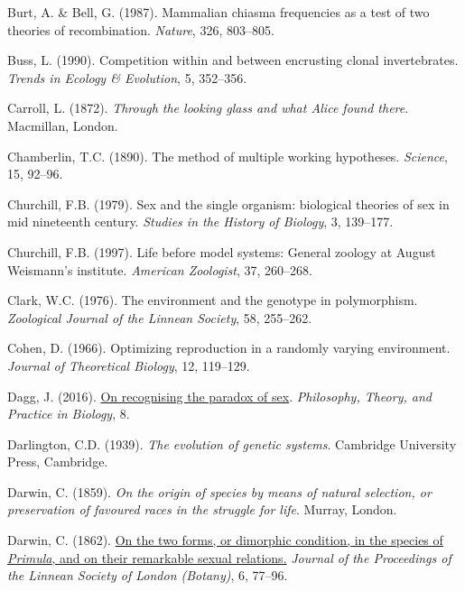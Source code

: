 \documentclass[
  american,
  letterpaper,
]{book}
\newlength{\cslhangindent}
\newenvironment{CSLReferences}[2] %
 {\begin{list}{}{%
  \setlength{\itemindent}{0pt}
  \setlength{\leftmargin}{0pt}
  \setlength{\parsep}{0pt}
  \ifodd #1
   \setlength{\leftmargin}{\cslhangindent}
   \setlength{\itemindent}{-1\cslhangindent}
  \fi
  \setlength{\itemsep}{#2\baselineskip}}}
 {\end{list}}
\begin{document}
\begin{CSLReferences}{1}{0}
Burt, A. \& Bell, G. (1987). Mammalian chiasma frequencies as a test of
two theories of recombination. \emph{Nature}, 326, 803--805.

Buss, L. (1990). Competition within and between encrusting clonal
invertebrates. \emph{Trends in Ecology \& Evolution}, 5, 352--356.

Carroll, L. (1872). \emph{Through the looking glass and what {Alice}
found there}. Macmillan, London.

Chamberlin, T.C. (1890). The method of multiple working hypotheses.
\emph{Science}, 15, 92--96.

Churchill, F.B. (1979). Sex and the single organism: {b}iological
theories of sex in mid nineteenth century. \emph{Studies in the History
of Biology}, 3, 139--177.

Churchill, F.B. (1997). Life before model systems: General zoology at
{August Weismann's} institute. \emph{American Zoologist}, 37, 260--268.

Clark, W.C. (1976). The environment and the genotype in polymorphism.
\emph{Zoological Journal of the Linnean Society}, 58, 255--262.

Cohen, D. (1966). Optimizing reproduction in a randomly varying
environment. \emph{Journal of Theoretical Biology}, 12, 119--129.

Dagg, J. (2016). \href{https://doi.org/10.3998/ptb.6959004.0008.003}{On
recognising the paradox of sex}. \emph{Philosophy, Theory, and Practice
in Biology}, 8.

Darlington, C.D. (1939). \emph{The evolution of genetic systems}.
Cambridge University Press, Cambridge.

Darwin, C. (1859). \emph{On the origin of species by means of natural
selection, or preservation of favoured races in the struggle for life}.
Murray, London.

Darwin, C. (1862).
\href{https://doi.org/10.1111/j.1095-8312.1862.tb01218.x}{On the two
forms, or dimorphic condition, in the species of \emph{{P}rimula}, and
on their remarkable sexual relations.} \emph{Journal of the Proceedings
of the Linnean Society of London (Botany)}, 6, 77--96.


\end{CSLReferences}
\end{document}
